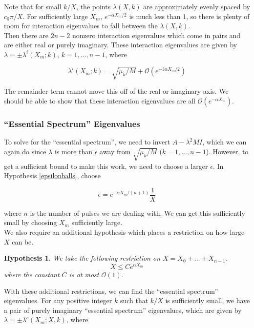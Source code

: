 \documentclass[12pt]{article}
\newtheorem{hypothesis}{Hypothesis}
\begin{document}
Note that for small $k/X$, the points $\lambda(X, k)$ are approximately evenly spaced by $c_0 \pi/X$. For sufficiently large $X_m$, $e^{-\alpha X_m/2}$ is much less than 1, so there is plenty of room for interaction eigenvalues to fall between the $\lambda(X, k)$.\\

Then there are $2n-2$ nonzero interaction eigenvalues which come in pairs and are either real or purely imaginary. These interaction eigenvalues are given by $\lambda = \pm \lambda^i(X_m; k)$, $k = 1, \dots, n-1$, where

\begin{equation}\label{inteigs}
\lambda^i(X_m; k) = \sqrt{\mu_k / M} + \mathcal{O}(e^{-3 \alpha X_m/2})
\end{equation}

The remainder term cannot move this off of the real or imaginary axis. We should be able to show that these interaction eigenvalues are all $\mathcal{O}(e^{-\alpha X_m})$.

\subsubsection{``Essential Spectrum'' Eigenvalues}

To solve for the ``essential spectrum'', we need to invert $A - \lambda^2 M I$, which we can again do since $\lambda$ is more than $\epsilon$ away from $\sqrt{\mu_k/M}$ ($k = 1, \dots, n-1$). However, to get a sufficient bound to make this work, we need to choose a larger $\epsilon$. In Hypothesis \ref{epsilonballs}, choose

\[
\epsilon = e^{-\alpha X_m/(n+1)} \frac{1}{X}
\]

where $n$ is the number of pulses we are dealing with. We can get this sufficiently small by choosing $X_m$ sufficiently large.\\ 

We also require an additional hypothesis which places a restriction on how large $X$ can be.

\begin{hypothesis}\label{Xrestriction}
We take the following restriction on $X = X_0 + \dots + X_{n-1}$.
\[
X \leq C e^{\alpha X_m}
\]
where the constant $C$ is at most $\mathcal{O}(1)$.
\end{hypothesis}

With these additional restrictions, we can find the ``essential spectrum'' eigenvalues. For any positive integer $k$ such that $k/X$ is sufficiently small, we have a pair of purely imaginary ``essential spectrum'' eigenvalues, which are given by $\lambda = \pm \lambda^c(X_m; X, k)$, where
\end{document}
